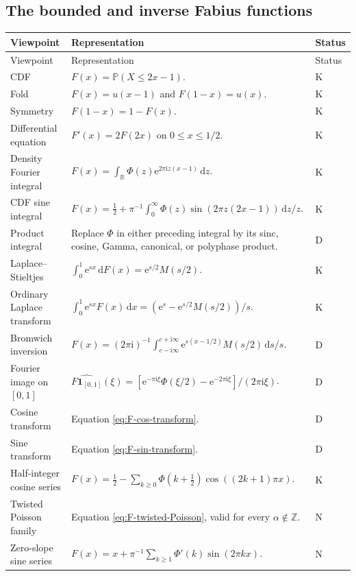 \documentclass[11pt,oneside]{article}
\numberwithin{equation}{section}
\theoremstyle{definition}
\theoremstyle{remark}
\newcommand{\R}{\mathbb R}
\newcommand{\Z}{\mathbb Z}
\newcommand{\Prob}{\mathbb P}
\newcommand{\dd}{\,\mathrm d}
\newcommand{\e}{\mathrm e}
\newcommand{\ii}{\mathrm i}
\newcommand{\statusknown}{\textcolor{deepviolet}{\textsf{K}}}
\newcommand{\statusderived}{\textcolor{derivedblue}{\textsf{D}}}
\newcommand{\statusnew}{\textcolor{provedgreen}{\textsf{N}}}
\begin{document}
\subsection{The bounded and inverse Fabius functions}

\begin{longtable}{@{}p{}p{}p{}@{}}
\toprule
Viewpoint & Representation & Status\\
\midrule
\endfirsthead
\toprule
Viewpoint & Representation & Status\\
\midrule
\endhead
CDF &
$F(x)=\Prob(X\le2x-1)$. & \statusknown\\
Fold &
$F(x)=u(x-1)$ and $F(1-x)=u(x)$. & \statusknown\\
Symmetry &
$F(1-x)=1-F(x)$. & \statusknown\\
Differential equation &
$F'(x)=2F(2x)$ on $0\le x\le1/2$. & \statusknown\\
Density Fourier integral &
$F(x)=\int_{\R}\Phi(z)\e^{2\pi\ii z(x-1)}\dd z$. & \statusknown\\
CDF sine integral &
$F(x)=\tfrac12+\pi^{-1}\int_0^\infty\Phi(z)
\sin(2\pi z(2x-1))\dd z/z$. & \statusknown\\
Product integral &
Replace $\Phi$ in either preceding integral by its sinc, cosine, Gamma, canonical, or polyphase product. & \statusderived\\
Laplace--Stieltjes &
$\int_0^1\e^{sx}\dd F(x)=\e^{s/2}M(s/2)$. & \statusknown\\
Ordinary Laplace transform &
$\int_0^1\e^{sx}F(x)\dd x=(\e^s-\e^{s/2}M(s/2))/s$. & \statusknown\\
Bromwich inversion &
$F(x)=(2\pi\ii)^{-1}\int_{c-\ii\infty}^{c+\ii\infty}
\e^{s(x-1/2)}M(s/2)\dd s/s$. & \statusderived\\
Fourier image on $[0,1]$ &
$\widehat{F\mathbf1_{[0,1]}}(\xi)=
[\e^{-\pi\ii\xi}\Phi(\xi/2)-\e^{-2\pi\ii\xi}]/(2\pi\ii\xi)$. & \statusderived\\
Cosine transform &
Equation \eqref{eq:F-cos-transform}. & \statusderived\\
Sine transform &
Equation \eqref{eq:F-sin-transform}. & \statusderived\\
Half-integer cosine series &
$F(x)=\tfrac12-\sum_{k\ge0}\Phi(k+\tfrac12)\cos((2k+1)\pi x)$. & \statusknown\\
Twisted Poisson family &
Equation \eqref{eq:F-twisted-Poisson}, valid for every $\alpha\notin\Z$. & \statusnew\\
Zero-slope sine series &
$F(x)=x+\pi^{-1}\sum_{k\ge1}\Phi'(k)\sin(2\pi kx)$. & \statusnew\\

\end{longtable}
\end{document}
